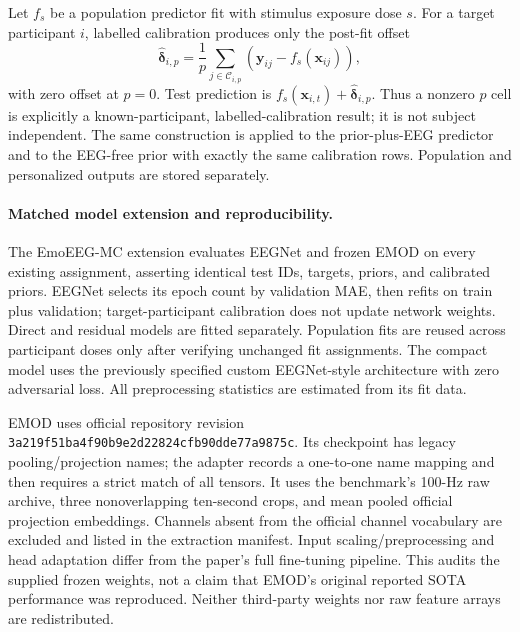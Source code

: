 Let $f_{s}$ be a population predictor fit with stimulus exposure dose $s$. For a
target participant $i$, labelled calibration produces only the post-fit offset
\begin{equation}
  \widehat{\boldsymbol\delta}_{i,p}
  = \frac{1}{p}\sum_{j\in\mathcal C_{i,p}}
  \left(\mathbf y_{ij}-f_s(\mathbf x_{ij})\right),
\end{equation}
with zero offset at $p=0$. Test prediction is
$f_s(\mathbf x_{i,t})+\widehat{\boldsymbol\delta}_{i,p}$. Thus a nonzero $p$
cell is explicitly a known-participant, labelled-calibration result; it is not
subject independent. The same construction is applied to the prior-plus-EEG
predictor and to the EEG-free prior with exactly the same calibration rows.
Population and personalized outputs are stored separately.



\paragraph{Matched model extension and reproducibility.}
The EmoEEG-MC extension evaluates EEGNet and frozen EMOD on every existing
assignment, asserting identical test IDs, targets, priors, and calibrated priors.
EEGNet selects its epoch count by validation MAE, then refits on train plus
validation; target-participant calibration does not update network weights.
Direct and residual models are fitted separately. Population fits are reused
across participant doses only after verifying unchanged fit assignments.
The compact model uses the previously specified custom EEGNet-style architecture with zero
adversarial loss. All preprocessing statistics are estimated from its fit data.

EMOD uses official repository revision
\texttt{3a219f51ba4f90b9e2d22824cfb90dde77a9875c}.
Its checkpoint has legacy pooling/projection names; the adapter records a
one-to-one name mapping and then requires a strict match of all tensors.
It uses the benchmark's 100-Hz raw archive, three nonoverlapping ten-second
crops, and mean pooled official projection embeddings. Channels absent from the
official channel vocabulary are excluded and listed in the extraction manifest.
Input scaling/preprocessing and head adaptation differ from the paper's full
fine-tuning pipeline. This audits the supplied frozen weights, not a claim that
EMOD's original reported SOTA performance was reproduced. Neither third-party
weights nor raw feature arrays are redistributed.

